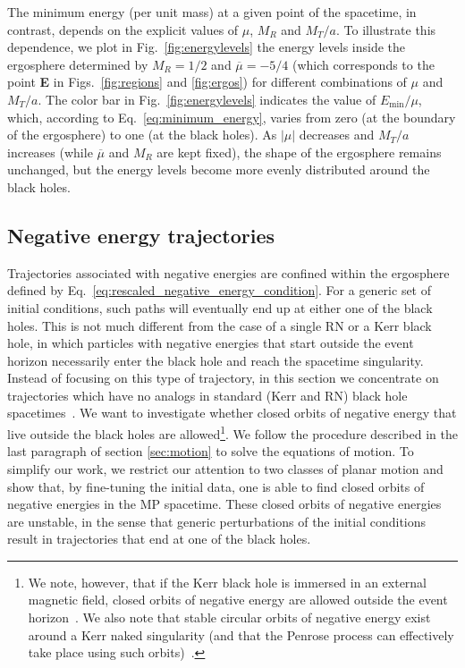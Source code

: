 The minimum energy (per unit mass) at a given point of the spacetime, in contrast, depends on the explicit values of $\mu$, $M_R$ and $M_T/a$. To illustrate this dependence, we plot in Fig.~\ref{fig:energylevels} the energy levels inside the ergosphere determined by $M_R=1/2$ and $\overline \mu = -5/4$ (which corresponds to the point \textbf{E} in Figs.~\ref{fig:regions} and \ref{fig:ergos}) for different combinations of $\mu$ and $M_T/a$. The color bar in Fig.~\ref{fig:energylevels} indicates the value of $E_{\mathrm{min}}/\mu$, which, according to Eq.~\eqref{eq:minimum_energy}, varies from zero (at the boundary of the ergosphere) to one (at the black holes). As $|\mu|$ decreases and $M_T/a$ increases (while $\overline \mu$ and $M_R$ are kept fixed), the shape of the ergosphere remains unchanged, but the energy levels become more evenly distributed around the black holes.

\subsection{Negative energy trajectories}
\label{sec:neg_energy}
Trajectories associated with negative energies are confined within the ergosphere defined by Eq.~\eqref{eq:rescaled_negative_energy_condition}. For a generic set of initial conditions, such paths will eventually end up at either one of the black holes. This is not much different from the case of a single RN or a Kerr black hole, in which particles with negative energies that start outside the event horizon necessarily enter the black hole and reach the spacetime singularity. Instead of focusing on this type of trajectory, in this section we concentrate on trajectories which have no analogs in standard (Kerr and RN) black hole spacetimes~\cite{Grib:2013hxa,Zaslavskii:2020crn}. We want to investigate whether closed orbits of negative energy that live outside the black holes are allowed\footnote{We note, however, that if the Kerr black hole is immersed in an external magnetic field, closed orbits of negative energy are allowed outside the event horizon~\cite{PRASANA1982,FELICE2004}. We also note that stable circular orbits of negative energy exist around a Kerr naked singularity (and that the Penrose process can effectively take place using such orbits)~\cite{STUCHLIK1980}.}.
We follow the procedure described in the last paragraph of section \ref{sec:motion} to solve the equations of motion. To simplify our work, we restrict our attention to two classes of planar motion and show that, by fine-tuning the initial data, one is able to find closed orbits of negative energies in the MP spacetime. These closed orbits of negative energies are unstable, in the sense that generic perturbations of the initial conditions result in trajectories that end at one of the black holes.


